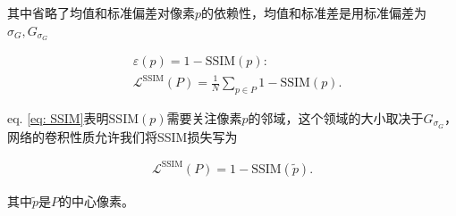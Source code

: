 \documentclass[a4paper]{ctexart}
\begin{document}
其中省略了均值和标准偏差对像素$p$的依赖性，均值和标准差是用标准偏差为$\sigma_G,G_{\sigma_G}$

\begin{equation}
	\begin{aligned}
		&\varepsilon(p)=1-\text{SSIM}(p): \\  &\mathcal{L}^{\text{SSIM}}(P)=\frac{1}{N}\sum_{p \in P}1-\text{SSIM}(p).
	\end{aligned}
	\label{eq: SSIM loss}
\end{equation}

eq. \ref{eq: SSIM}表明$\text{SSIM}(p)$需要关注像素$p$的邻域，这个领域的大小取决于$G_{\sigma_G}$，网络的卷积性质允许我们将SSIM损失写为

\begin{equation}
	\begin{aligned}
		\mathcal{L}^{\text{SSIM}}(P)=1-\text{SSIM}(\tilde{p}).
	\end{aligned}
	\label{eq: revised_SSIM loss}
\end{equation}

其中$\tilde{p}$是$P$的中心像素。
\end{document}
